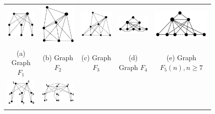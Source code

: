  \begin{figure}[htb]	
 
   \centering
  \begin{tabular}{  c c c c  c}
    \includegraphics[width=2.5cm]{img/f1.png} 
    & 
    \includegraphics[width=2.3cm]{img/f2.png} 
    & 
    \includegraphics[width=3cm]{img/f3.png} 
    & 
    \includegraphics[width=3cm]{img/f4.png} 
    & 
    \includegraphics[width=3cm]{img/f5.png} 
    \\
    \footnotesize 
    (a)  \footnotesize Graph $F_1$ 
    & 
    \footnotesize (b) Graph $F_2$
    & 
    \footnotesize (c) Graph $F_3$
    & 
    \footnotesize (d) Graph $F_4$
    & 
    \footnotesize (e) Graph $F_5(n),n\geq7$
    \\%
        \includegraphics[width=2.5cm]{img/f6.png} 
    & 
    \includegraphics[width=3.5cm]{img/f7.png} 

\end{tabular}
\end{figure}
